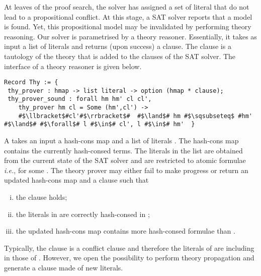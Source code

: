 \documentclass[utf8,a4paper,UKenglish,cleveref, autoref, thm-restate]{lipics-v2019}
\begin{document}
At leaves of the proof search, the solver has assigned a set of
literal that do not lead to a propositional conflict. At this stage, a
SAT solver reports that a model is found.
%
Yet, this propositional model may be invalidated by performing theory reasoning.
%
Our solver is parametrised by a theory reasoner. Essentially, it takes
as input a list of literals and returns (upon success) a clause. The
clause is a tautology of the theory that is added to the clauses of
the SAT solver.
%
The interface of a theory reasoner is given below.
\begin{verbatim}
Record Thy := {
 thy_prover : hmap -> list literal -> option (hmap * clause);
 thy_prover_sound : forall hm hm' cl cl',
    thy_prover hm cl = Some (hm',cl') ->
    #$\llbracket$#cl'#$\rrbracket$#  #$\land$# hm #$\sqsubseteq$ #hm' #$\land$# #$\forall$# l #$\in$# cl', l #$\in$# hm'  }
\end{verbatim}
A  takes an input a hash-cons map  and a
list of literals .  The hash-cons map  contains the
currently hash-consed terms. The literals in the list  are
obtained from the current state of the SAT solver and are restricted
to atomic formulae \emph{i.e.},  for some .
%
The theory prover may either fail to make progress or return an
updated hash-cons map  and a clause  such that
\begin{enumerate}[i)]
\item the clause  holds;
\item the literals in  are correctly hash-consed in ;
\item the updated hash-cons map  contains more hash-consed formulae than .
\end{enumerate}
Typically, the clause  is a conflict clause and therefore
the literals of  are including in those of
. However, we open the possibility to perform theory
propagation and generate a clause made of new literals.
%
\end{document}
